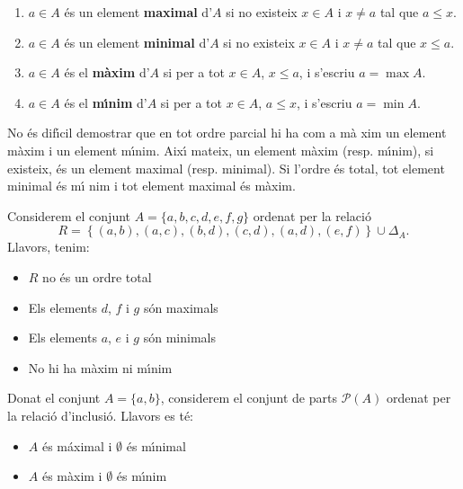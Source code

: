 \begin{enumerate}
\item $a\in A$ \'{e}s un element \textbf{maximal} d'$A$ si no existeix $x\in
A$ i $x\neq a$ tal que $a\leq x$.

\item $a\in A$ \'{e}s un element \textbf{minimal} d'$A$ si no existeix $x\in
A$ i $x\neq a$ tal que $x\leq a$.

\item $a\in A$ \'{e}s el \textbf{m\`{a}xim} d'$A$ si per a tot $x\in A$, $%
x\leq a$, i s'escriu $a=\max A$.

\item $a\in A$ \'{e}s el \textbf{m\'{\i}nim} d'$A$ si per a tot $x\in A$, $%
a\leq x$, i s'escriu $a=\min A$.
\end{enumerate}

No \'{e}s dif\'{\i}cil demostrar que en tot ordre parcial hi ha com a m\`{a}%
xim un element m\`{a}xim i un element m\'{\i}nim. Aix\'{\i} mateix, un
element m\`{a}xim (resp. m\'{\i}nim), si existeix, \'{e}s un element maximal
(resp. minimal). Si l'ordre \'{e}s total, tot element minimal \'{e}s m\'{\i}%
nim i tot element maximal \'{e}s m\`{a}xim.

\begin{exemple}
Considerem el conjunt $A=\{a,b,c,d,e,f,g\}$ ordenat per la relaci\'{o}%
\begin{equation*}
R=\left\{ (a,b),(a,c),(b,d),(c,d),(a,d),(e,f)\right\} \cup\Delta_{A}\text{.}
\end{equation*}
Llavors, tenim:

\begin{itemize}
\item $R$ no \'{e}s un ordre total

\item Els elements $d$, $f$ i $g$ s\'{o}n maximals

\item Els elements $a$, $e$ i $g$ s\'{o}n minimals

\item No hi ha m\`{a}xim ni m\'{\i}nim
\end{itemize}
\end{exemple}

\begin{exemple}
Donat el conjunt $A=\{a,b\}$, considerem el conjunt de parts $\mathcal{P}(A)$
ordenat per la relaci\'{o} d'inclusi\'{o}. Llavors es t\'{e}:

\begin{itemize}
\item $A$ \'{e}s m\'{a}ximal i $\emptyset$ \'{e}s m\'{\i}nimal

\item $A$ \'{e}s m\`{a}xim i $\emptyset$ \'{e}s m\'{\i}nim
\end{itemize}
\end{exemple}

